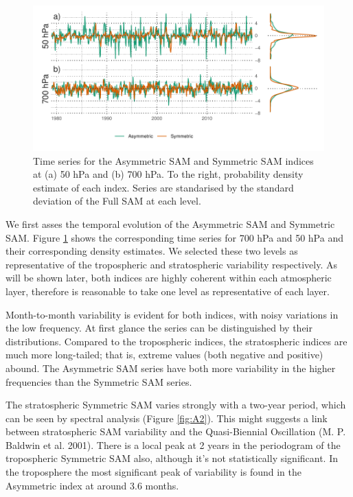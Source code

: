 \documentclass[smallextended]{svjour3}       %
\begin{document}
\begin{figure}
\includegraphics{asymsam-timeseries-1} \caption{Time series for the Asymmetric SAM and Symmetric SAM indices at (a) 50 hPa and (b) 700 hPa. To the right, probability density estimate of each index. Series are standarised by the standard deviation of the Full SAM at each level.}\label{fig:asymsam-timeseries}
\end{figure}

We first asses the temporal evolution of the Asymmetric SAM and Symmetric SAM. Figure \ref{fig:asymsam-timeseries} shows the corresponding time series for 700 hPa and 50 hPa and their corresponding density estimates. We selected these two levels as representative of the tropospheric and stratospheric variability respectively. As will be shown later, both indices are highly coherent within each atmospheric layer, therefore is reasonable to take one level as representative of each layer.

Month-to-month variability is evident for both indices, with noisy variations in the low frequency. At first glance the series can be distinguished by their distributions. Compared to the tropospheric indices, the stratospheric indices are much more long-tailed; that is, extreme values (both negative and positive) abound. The Asymmetric SAM series have both more variability in the higher frequencies than the Symmetric SAM series.

The stratospheric Symmetric SAM varies strongly with a two-year period, which can be seen by spectral analysis (Figure \ref{fig:A2}). This might suggests a link between stratospheric SAM variability and the Quasi-Biennial Oscillation (M. P. Baldwin et al. 2001). There is a local peak at 2 years in the periodogram of the tropospheric Symmetric SAM also, although it's not statistically significant. In the troposphere the most significant peak of variability is found in the Asymmetric index at around 3.6 months.
\end{document}
